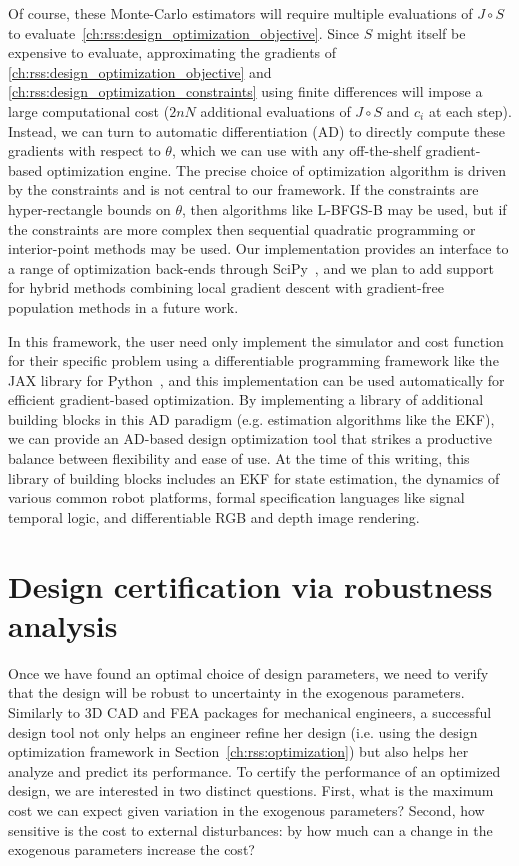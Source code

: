 Of course, these Monte-Carlo estimators will require multiple evaluations of $J\circ S$ to evaluate~\eqref{ch:rss:design_optimization_objective}. Since $S$ might itself be expensive to evaluate, approximating the gradients of \eqref{ch:rss:design_optimization_objective} and \eqref{ch:rss:design_optimization_constraints} using finite differences will impose a large computational cost ($2nN$ additional evaluations of $J\circ S$ and $c_i$ at each step). Instead, we can turn to automatic differentiation (AD) to directly compute these gradients with respect to $\theta$, which we can use with any off-the-shelf gradient-based optimization engine. The precise choice of optimization algorithm is driven by the constraints and is not central to our framework. If the constraints are hyper-rectangle bounds on $\theta$, then algorithms like L-BFGS-B may be used, but if the constraints are more complex then sequential quadratic programming or interior-point methods may be used. Our implementation provides an interface to a range of optimization back-ends through SciPy~\cite{2020SciPy-NMeth}, and we plan to add support for hybrid methods combining local gradient descent with gradient-free population methods in a future work.

In this framework, the user need only implement the simulator and cost function for their specific problem using a differentiable programming framework like the JAX library for Python~\cite{jax2018github}, and this implementation can be used automatically for efficient gradient-based optimization. By implementing a library of additional building blocks in this AD paradigm (e.g. estimation algorithms like the EKF), we can provide an AD-based design optimization tool that strikes a productive balance between flexibility and ease of use. At the time of this writing, this library of building blocks includes an EKF for state estimation, the dynamics of various common robot platforms, formal specification languages like signal temporal logic, and differentiable RGB and depth image rendering.

\section{Design certification via robustness analysis}\label{ch:rss:analysis}

Once we have found an optimal choice of design parameters, we need to verify that the design will be robust to uncertainty in the exogenous parameters. Similarly to 3D CAD and FEA packages for mechanical engineers, a successful design tool not only helps an engineer refine her design (i.e. using the design optimization framework in Section~\ref{ch:rss:optimization}) but also helps her analyze and predict its performance. To certify the performance of an optimized design, we are interested in two distinct questions. First, what is the maximum cost we can expect given variation in the exogenous parameters? Second, how sensitive is the cost to external disturbances: by how much can a change in the exogenous parameters increase the cost?

